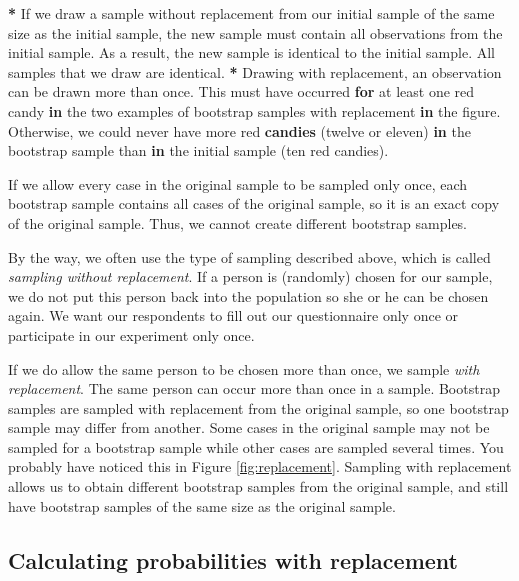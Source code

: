 \documentclass[a4paper]{book}
\newenvironment{Shaded}{\begin{snugshade}}{\end{snugshade}}
\newcommand{\KeywordTok}[1]{\textcolor[rgb]{0,0,0}{\textbf{#1}}}
\newcommand{\StringTok}[1]{\textcolor[rgb]{0.00,0.00,0.00}{#1}}
\newcommand{\ControlFlowTok}[1]{\textcolor[rgb]{0.00,0.00,0.00}{\textbf{#1}}}
\newcommand{\OperatorTok}[1]{\textcolor[rgb]{0.00,0.00,0.00}{\textbf{#1}}}
\newcommand{\NormalTok}[1]{#1}
\theoremstyle{definition}
\theoremstyle{definition}
\theoremstyle{definition}
\theoremstyle{remark}
\begin{document}
\begin{Shaded}
\begin{Highlighting}[]
\OperatorTok{*}\StringTok{ }\NormalTok{If we draw a sample without replacement from our initial sample of the same}
\NormalTok{size as the initial sample, the new sample must contain all observations from}
\NormalTok{the initial sample. As a result, the new sample is identical to the initial}
\NormalTok{sample. All samples that we draw are identical.}
\OperatorTok{*}\StringTok{ }\NormalTok{Drawing with replacement, an observation can be drawn more than once. This}
\NormalTok{must have occurred }\ControlFlowTok{for}\NormalTok{ at least one red candy }\ControlFlowTok{in}\NormalTok{ the two examples of bootstrap}
\NormalTok{samples with replacement }\ControlFlowTok{in}\NormalTok{ the figure. Otherwise, we could never have more red}
\KeywordTok{candies}\NormalTok{ (twelve or eleven) }\ControlFlowTok{in}\NormalTok{ the bootstrap sample than }\ControlFlowTok{in}\NormalTok{ the initial sample}
\NormalTok{(ten red candies).}
\end{Highlighting}
\end{Shaded}

If we allow every case in the original sample to be sampled only once,
each bootstrap sample contains all cases of the original sample, so it
is an exact copy of the original sample. Thus, we cannot create
different bootstrap samples.

By the way, we often use the type of sampling described above, which is
called \emph{sampling without replacement}. If a person is (randomly)
chosen for our sample, we do not put this person back into the
population so she or he can be chosen again. We want our respondents to
fill out our questionnaire only once or participate in our experiment
only once.

If we do allow the same person to be chosen more than once, we sample
\emph{with replacement}. The same person can occur more than once in a
sample. Bootstrap samples are sampled with replacement from the original
sample, so one bootstrap sample may differ from another. Some cases in
the original sample may not be sampled for a bootstrap sample while
other cases are sampled several times. You probably have noticed this in
Figure \ref{fig:replacement}. Sampling with replacement allows us to
obtain different bootstrap samples from the original sample, and still
have bootstrap samples of the same size as the original sample.

\subsection{Calculating probabilities with
replacement}\label{calculating-probabilities-with-replacement}
\end{document}

